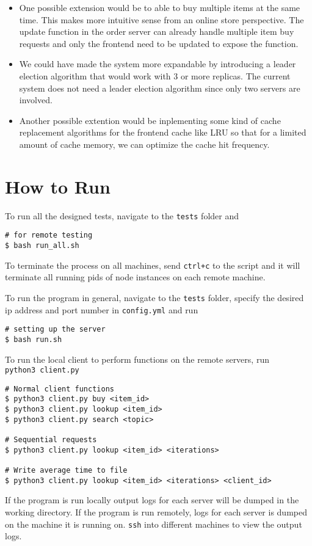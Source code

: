 \documentclass[11pt,]{article}
\begin{document}
\begin{itemize}
\item
  One possible extension would be to able to buy multiple items at the
  same time. This makes more intuitive sense from an online store
  perspective. The update function in the order server can already
  handle multiple item buy requests and only the frontend need to be
  updated to expose the function.
\item
  We could have made the system more expandable by introducing a leader
  election algorithm that would work with 3 or more replicas. The
  current system does not need a leader election algorithm since only
  two servers are involved.
\item
  Another possible extention would be inplementing some kind of cache
  replacement algorithms for the frontend cache like LRU so that for a
  limited amount of cache memory, we can optimize the cache hit
  frequency.
\end{itemize}

\hypertarget{how-to-run}{%
\section{How to Run}\label{how-to-run}}

To run all the designed tests, navigate to the \texttt{tests} folder and

\begin{verbatim}
# for remote testing
$ bash run_all.sh
\end{verbatim}

\noindent To terminate the process on all machines, send \texttt{ctrl+c}
to the script and it will terminate all running pids of node instances
on each remote machine. \newline

\noindent To run the program in general, navigate to the \texttt{tests}
folder, specify the desired ip address and port number in
\texttt{config.yml} and run

\begin{verbatim}
# setting up the server
$ bash run.sh
\end{verbatim}

\noindent To run the local client to perform functions on the remote
servers, run \texttt{python3\ client.py}

\begin{verbatim}
# Normal client functions
$ python3 client.py buy <item_id>
$ python3 client.py lookup <item_id>
$ python3 client.py search <topic>

# Sequential requests
$ python3 client.py lookup <item_id> <iterations>

# Write average time to file
$ python3 client.py lookup <item_id> <iterations> <client_id>
\end{verbatim}

\noindent If the program is run locally output logs for each server will
be dumped in the working directory. If the program is run remotely, logs
for each server is dumped on the machine it is running on. \texttt{ssh}
into different machines to view the output logs.





\newpage
\singlespacing 

\end{document}

